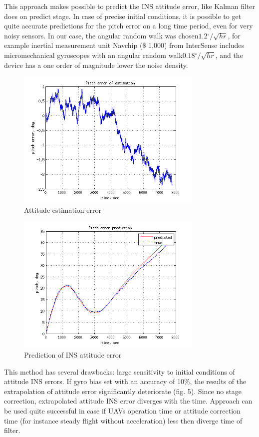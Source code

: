 \documentclass[conference, utf8]{IEEEtran}
\begin{document}
This approach makes possible to predict the INS attitude error, 
like Kalman filter does on predict stage. In case of precise initial conditions, 
it is possible to get quite accurate predictions for the pitch error on a long 
time period, even for very noisy sensors. In our case, the angular random 
walk was chosen$1.2{}^\circ /\sqrt{hr} $, for example inertial measurement 
unit Navchip (\$ 1,000) from InterSense includes micromechanical gyroscopes 
with an angular random walk$0.18{}^\circ /\sqrt{hr} $, and the device has a 
one order of magnitude lower the noise density. 

\begin{figure}[!t]
  \centering
  \includegraphics[width=3.5in]{theta_err_of_err}
  \caption{Attitude estimation error}
  \label{fig:theta_err_err}
\end{figure}

\begin{figure}[!t]
  \centering
  \includegraphics[width=3.5in]{theta_err}
  \caption{Prediction of  INS attitude error}
  \label{fig:theta_err}
\end{figure}

This method has several drawbacks: large sensitivity to initial conditions 
of attitude INS errors. If gyro bias set with an accuracy of 10\%, the results 
of the extrapolation of attitude error significantly deteriorate (fig. 5). 
Since no stage correction, extrapolated attitude INS error diverges with the 
time. Approach can be used quite successful in case if UAVs operation time 
or attitude correction time (for instance steady flight without acceleration) 
less then diverge time of filter.
\end{document}
